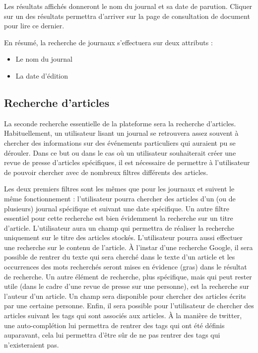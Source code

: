 Les résultats affichés donneront le nom du journal et sa date de parution. Cliquer sur un des résultats permettra d'arriver sur la page de consultation de document pour lire ce dernier.

En résumé, la recherche de journaux s'effectuera sur deux attributs :
\begin{itemize}
	\item Le nom du journal
	\item La date d'édition
\end{itemize}

\subsection{Recherche d'articles}
\label{sec:recherche_article}

La seconde recherche essentielle de la plateforme sera la recherche d'articles. Habituellement, un utilisateur lisant un journal se retrouvera assez souvent à chercher des informations sur des événements particuliers qui auraient pu se dérouler. Dans ce but ou dans le cas où un utilisateur souhaiterait créer une revue de presse d'articles spécifiques, il est nécessaire de permettre à l'utilisateur de pouvoir chercher avec de nombreux filtres différents des articles.

Les deux premiers filtres sont les mêmes que pour les journaux et suivent le même fonctionnement : l'utilisateur pourra chercher des articles d'un (ou de plusieurs) journal spécifique et suivant une date spécifique. Un autre filtre essentiel pour cette recherche est bien évidemment la recherche sur un titre d'article. L'utilisateur aura un champ qui permettra de réaliser la recherche uniquement sur le titre des articles stockés. L'utilisateur pourra aussi effectuer une recherche sur le contenu de l'article. À l'instar d'une recherche Google, il sera possible de rentrer du texte qui sera cherché dans le texte d'un article et les occurrences des mots recherchés seront mises en évidence (gras) dans le résultat de recherche. Un autre élément de recherche, plus spécifique, mais qui peut rester utile (dans le cadre d'une revue de presse sur une personne), est la recherche sur l'auteur d'un article. Un champ sera disponible pour chercher des articles écrits par une certaine personne. Enfin, il sera possible pour l'utilisateur de chercher des articles suivant les tags qui sont associés aux articles. À la manière de twitter, une auto-complétion lui permettra de rentrer des tags qui ont été définis auparavant, cela lui permettra d'être sûr de ne pas rentrer des tags qui n'existeraient pas.

